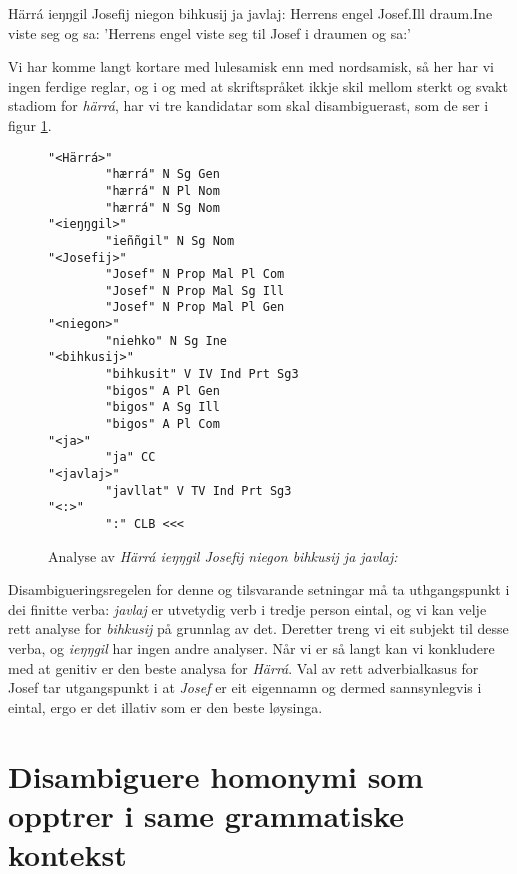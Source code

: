\documentclass[a4paper,nynorsk]{article}
\begin{document}
\begin{example}\label{engel}
\gll Härrá ieŋŋgil Josefij niegon bihkusij ja javlaj:
    Herrens engel Josef.Ill draum.Ine {viste seg} og sa:
\glt 'Herrens engel viste seg til Josef i draumen og sa:' 
\glend    
\end{example}

Vi har komme langt kortare med lulesamisk enn med nordsamisk, så her har vi ingen ferdige reglar, og i og med at skriftspråket ikkje skil mellom sterkt og svakt stadiom for \textit{härrá}, har vi tre kandidatar som skal disambiguerast, som de ser i figur \ref{engelanalyse}. %

\begin{figure}[htbp]
\begin{center}
\begin{verbatim}
"<Härrá>"
        "hærrá" N Sg Gen
        "hærrá" N Pl Nom
        "hærrá" N Sg Nom
"<ieŋŋgil>"
        "ieññgil" N Sg Nom
"<Josefij>"
        "Josef" N Prop Mal Pl Com
        "Josef" N Prop Mal Sg Ill
        "Josef" N Prop Mal Pl Gen
"<niegon>"
        "niehko" N Sg Ine
"<bihkusij>"
        "bihkusit" V IV Ind Prt Sg3
        "bigos" A Pl Gen
        "bigos" A Sg Ill
        "bigos" A Pl Com
"<ja>"
        "ja" CC
"<javlaj>" 
        "javllat" V TV Ind Prt Sg3
"<:>"
        ":" CLB <<<
\end{verbatim}
\caption{Analyse av \textit{Härrá ieŋŋgil Josefij niegon bihkusij ja javlaj:}}
\label{engelanalyse}
\end{center}
\end{figure}

Disambigueringsregelen for denne og tilsvarande setningar må ta uthgangspunkt i dei finitte verba: \textit{javlaj} er utvetydig verb i tredje person eintal, og vi kan velje rett analyse for \textit{bihkusij} på grunnlag av det. Deretter treng vi eit subjekt til desse verba, og \textit{ieŋŋgil} har ingen andre analyser. Når vi er så langt kan vi konkludere med at genitiv er den beste analysa for \textit{Härrá}. Val av rett adverbialkasus for Josef tar utgangspunkt i at \textit{Josef} er eit eigennamn og dermed sannsynlegvis i eintal, ergo er det illativ som er den beste løysinga. %




\section{Disambiguere homonymi som opptrer i same grammatiske kontekst}

\end{document}
